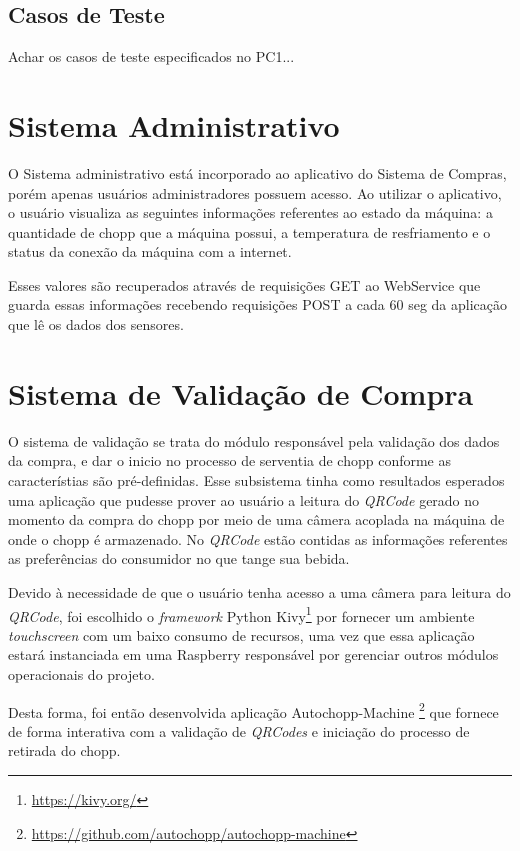 \subsection{Casos de Teste}

Achar os casos de teste especificados no PC1...


\section[Sistema Administrativo]{Sistema Administrativo}

O Sistema administrativo está incorporado ao aplicativo do Sistema de Compras, porém apenas usuários
administradores possuem acesso. Ao utilizar o aplicativo, o usuário visualiza
as seguintes informações referentes ao estado da máquina: a quantidade de chopp que a
máquina possui, a temperatura de resfriamento e o status da conexão da máquina com a internet.

Esses valores são recuperados através de requisições GET ao WebService que guarda essas informações recebendo
requisições POST a cada 60 seg da aplicação que lê os dados dos sensores. 

\section[Sistema de Validação de Compra]{Sistema de Validação de Compra}

O sistema de validação se trata do módulo responsável pela validação dos dados da compra,
e dar o inicio no processo de serventia de chopp conforme as característias são pré-definidas.
Esse subsistema tinha como resultados esperados uma aplicação que pudesse prover ao usuário
a leitura do \textit{QRCode} gerado no momento da compra do chopp por meio de uma câmera 
acoplada na máquina de onde o chopp é armazenado. No \textit{QRCode} estão contidas as informações
referentes as preferências do consumidor no que tange sua bebida.

Devido à necessidade de que o usuário tenha acesso a uma câmera para leitura do \textit{QRCode},
foi escolhido o \textit{framework} Python Kivy\footnote{\url{https://kivy.org/}} por fornecer um ambiente
\textit{touchscreen} com um baixo consumo de recursos, uma vez que essa aplicação estará 
instanciada em uma Raspberry responsável por gerenciar outros módulos operacionais do projeto.

Desta forma, foi então desenvolvida aplicação Autochopp-Machine \footnote{\url{https://github.com/autochopp/autochopp-machine}} que fornece de forma interativa 
com a validação de \textit{QRCodes} e iniciação do processo de retirada do chopp. 

